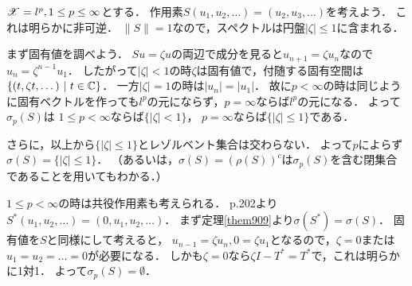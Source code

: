         \begin{Example}[例9.17, p.217]
            $\mathscr{X}=l^p, 1 \leq p \leq \infty$とする．
            作用素$S(u_1,u_2,\dots)=(u_2,u_3,\dots)$を考えよう．
            これは明らかに非可逆．
            $\|S\|=1$なので，スペクトルは円盤$|\zeta| \leq 1$に含まれる．

            まず固有値を調べよう．
            $S u=\zeta u$の両辺で成分を見ると$u_{n+1}=\zeta u_{n}$なので$u_n=\zeta^{n-1} u_1$．
            したがって$|\zeta|<1$の時$\zeta$は固有値で，付随する固有空間は$\{(t, \zeta t, \dots) ~|~ t \in \mathbb{C} \}$．
            一方$|\zeta|=1$の時は$|u_n|=|u_1|$．
            故に$p<\infty$の時は同じように固有ベクトルを作っても$l^p$の元にならず，$p=\infty$ならば$l^p$の元になる．
            よって$\sigma_p(S)$は
            $1 \leq p < \infty$ならば$\{ |\zeta| < 1 \}$，
            $p=\infty$ならば$\{|\zeta| \leq 1\}$である．

            さらに，以上から$\{|\zeta| \leq 1\}$とレゾルベント集合は交わらない．
            よって$p$によらず$\sigma(S)=\{|\zeta| \leq 1\}$．
            （あるいは，$\sigma(S)=(\rho(S))^c$は$\sigma_p(S)$を含む閉集合であることを用いてもわかる．）

            $1 \leq p < \infty$の時は共役作用素も考えられる．
            p.202より$S^* (u_1,u_2,\dots)=(0,u_1,u_2,\dots)$．
            まず定理\ref{them909}より$\sigma(S^*)=\sigma(S)$．
            固有値を$S$と同様にして考えると，
            $u_{n-1}=\zeta u_n, 0=\zeta u_1$となるので，$\zeta=0$または$u_1=u_2=\dots=0$が必要になる．
            しかも$\zeta=0$なら$\zeta I-T^*=T^*$で，これは明らかに1対1．
            よって$\sigma_p(S)=\emptyset$．
        \end{Example}

